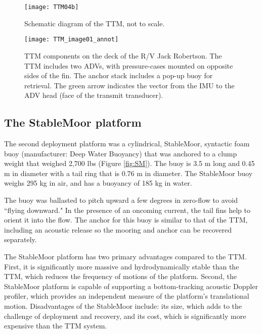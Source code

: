 \begin{figure}[t]
  \centering
  \texttt{[image: TTM04b]}
  \caption{Schematic diagram of the TTM, not to scale.}
  \label{fig:ttm:diagram}
\end{figure}

\begin{figure}[t]
  \centering
  \texttt{[image: TTM\_image01\_annot]}
  \caption{TTM components on the deck of the R/V Jack Robertson. The TTM includes two ADVs, with pressure-cases mounted on opposite sides of the fin. The anchor stack includes a pop-up buoy for retrieval. The green arrow indicates the vector from the IMU to the ADV head (face of the transmit transducer). }
  \label{fig:ttm:photo}
\end{figure}

\subsection{The StableMoor platform}

The second deployment platform was a cylindrical, StableMoor, syntactic foam buoy (manufacturer: Deep Water Buoyancy) that was anchored to a clump weight that weighed 2,700 lbs (Figure \ref{fig:SM}). The buoy is 3.5 m long and 0.45 m in diameter with a tail ring that is 0.76 m in diameter. The StableMoor buoy weighs 295 kg in air, and has a buoyancy of 185 kg in water. 

The buoy was ballasted to pitch upward a few degrees in zero-flow to avoid ``flying downward." In the presence of an oncoming current, the tail fins help to orient it into the flow. The anchor for this buoy is similar to that of the TTM, including an acoustic release so the mooring and anchor can be recovered separately.

The StableMoor platform has two primary advantages compared to the TTM. First, it is significantly more massive and hydrodynamically stable than the TTM, which reduces the frequency of motions of the platform. Second, the StableMoor platform is capable of supporting a bottom-tracking acoustic Doppler profiler, which provides an independent measure of the platform's translational motion. Disadvantages of the StableMoor include: its size, which adds to the challenge of deployment and recovery, and its cost, which is significantly more expensive than the TTM system.

